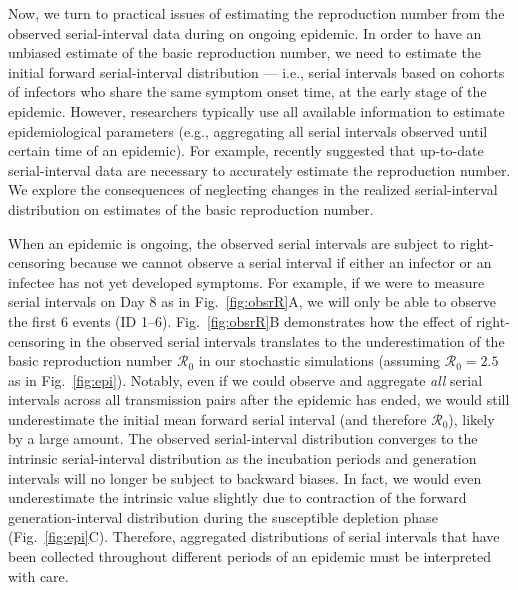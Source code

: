 \documentclass[12pt]{article}
\newcommand{\fref}[1]{Fig.~\ref{fig:#1}}
\newcommand{\Rx}[1]{\ensuremath{{\mathcal R}_{#1}}\xspace}
\newcommand{\Ro}{\Rx{0}}
\begin{document}
Now, we turn to practical issues of estimating the reproduction number from the observed serial-interval data during on ongoing epidemic.
In order to have an unbiased estimate of the basic reproduction number, we need to estimate the initial forward serial-interval distribution --- i.e., serial intervals based on cohorts of infectors who share the same symptom onset time, at the early stage of the epidemic.
However, researchers typically use all available information to estimate epidemiological parameters (e.g., aggregating all serial intervals observed until certain time of an epidemic).
For example, \cite{thompson2019improved} recently suggested that up-to-date serial-interval data are necessary to accurately estimate the reproduction number.
We explore the consequences of neglecting changes in the realized serial-interval distribution on estimates of the basic reproduction number.

When an epidemic is ongoing, the observed serial intervals are subject to right-censoring because we cannot observe a serial interval if either an infector or an infectee has not yet developed symptoms.
For example, if we were to measure serial intervals on Day 8 as in \fref{obsrR}A, we will only be able to observe the first 6 events (ID 1--6).
\fref{obsrR}B demonstrates how the effect of right-censoring in the observed serial intervals translates to the underestimation of the basic reproduction number \Ro in our stochastic simulations (assuming $\Ro = 2.5$ as in \fref{epi}).
Notably, even if we could observe and aggregate \emph{all} serial intervals across all transmission pairs after the epidemic has ended, we would still underestimate the initial mean forward serial interval (and therefore \Ro), likely by a large amount. 
The observed serial-interval distribution converges to the intrinsic serial-interval distribution as the incubation periods and generation intervals will no longer be subject to backward biases.
In fact, we would even underestimate the intrinsic value slightly due to contraction of the forward generation-interval distribution during the susceptible depletion phase (\fref{epi}C).
Therefore, aggregated distributions of serial intervals that have been collected throughout different periods of an epidemic must be interpreted with care.
\end{document}
